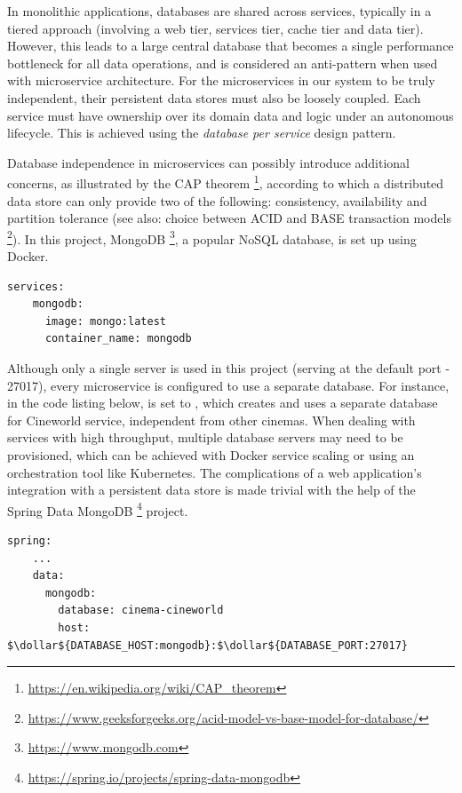 In monolithic applications, databases are shared across services, typically in a tiered approach (involving a web tier, services tier, cache tier and data tier). However, this leads to a large central database that becomes a single performance bottleneck for all data operations, and is considered an anti-pattern when used with microservice architecture. For the microservices in our system to be truly independent, their persistent data stores must also be loosely coupled. Each service must have ownership over its domain data and logic under an autonomous lifecycle. This is achieved using the \textit{database per service} design pattern.

Database independence in microservices can possibly introduce additional concerns, as illustrated by the CAP theorem \footnote{\url{https://en.wikipedia.org/wiki/CAP_theorem}}, according to which a distributed data store can only provide two of the following: consistency, availability and partition tolerance (see also: choice between ACID and BASE transaction models \footnote{\url{https://www.geeksforgeeks.org/acid-model-vs-base-model-for-database/}}). In this project, MongoDB \footnote{\url{https://www.mongodb.com}}, a popular NoSQL database, is set up using Docker.

\begin{lstlisting}[caption=Docker Compose file snippet for MongoDB server]
  services:
    mongodb:
      image: mongo:latest
      container_name: mongodb
\end{lstlisting}

Although only a single server is used in this project (serving at the default port - 27017), every microservice is configured to use a separate database. For instance, in the code listing below,  is set to , which creates and uses a separate database for Cineworld service, independent from other cinemas. When dealing with services with high throughput, multiple database servers may need to be provisioned, which can be achieved with Docker service scaling or using an orchestration tool like Kubernetes. The complications of a web application's integration with a persistent data store is made trivial with the help of the Spring Data MongoDB \footnote{\url{https://spring.io/projects/spring-data-mongodb}} project.

\begin{lstlisting}[caption=Snippet from Cineworld cinema's application properties]
  spring:
    ...
    data:
      mongodb:
        database: cinema-cineworld
        host: $\dollar${DATABASE_HOST:mongodb}:$\dollar${DATABASE_PORT:27017}
\end{lstlisting}

